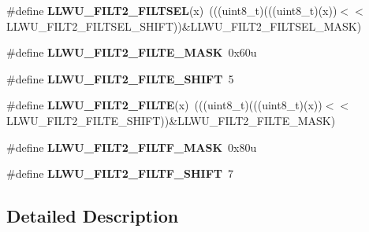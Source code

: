 \begin{DoxyCompactItemize}
\item 
\mbox{\label{group___l_l_w_u___register___masks_ga158cb43770e2439838189522bb7696a3}} 
\#define {\bfseries L\+L\+W\+U\+\_\+\+F\+I\+L\+T2\+\_\+\+F\+I\+L\+T\+S\+EL}(x)~(((uint8\+\_\+t)(((uint8\+\_\+t)(x))$<$$<$L\+L\+W\+U\+\_\+\+F\+I\+L\+T2\+\_\+\+F\+I\+L\+T\+S\+E\+L\+\_\+\+S\+H\+I\+FT))\&L\+L\+W\+U\+\_\+\+F\+I\+L\+T2\+\_\+\+F\+I\+L\+T\+S\+E\+L\+\_\+\+M\+A\+SK)
\item 
\mbox{\label{group___l_l_w_u___register___masks_ga6c6d4145e30bdb324bc6b137b2f7aada}} 
\#define {\bfseries L\+L\+W\+U\+\_\+\+F\+I\+L\+T2\+\_\+\+F\+I\+L\+T\+E\+\_\+\+M\+A\+SK}~0x60u
\item 
\mbox{\label{group___l_l_w_u___register___masks_gac309ec1ef795572d048b09ac35847bf1}} 
\#define {\bfseries L\+L\+W\+U\+\_\+\+F\+I\+L\+T2\+\_\+\+F\+I\+L\+T\+E\+\_\+\+S\+H\+I\+FT}~5
\item 
\mbox{\label{group___l_l_w_u___register___masks_ga3c7ed2286e6f1a0041610a9b7de636ef}} 
\#define {\bfseries L\+L\+W\+U\+\_\+\+F\+I\+L\+T2\+\_\+\+F\+I\+L\+TE}(x)~(((uint8\+\_\+t)(((uint8\+\_\+t)(x))$<$$<$L\+L\+W\+U\+\_\+\+F\+I\+L\+T2\+\_\+\+F\+I\+L\+T\+E\+\_\+\+S\+H\+I\+FT))\&L\+L\+W\+U\+\_\+\+F\+I\+L\+T2\+\_\+\+F\+I\+L\+T\+E\+\_\+\+M\+A\+SK)
\item 
\mbox{\label{group___l_l_w_u___register___masks_gab60be1393d84433fe44d4b332a77537c}} 
\#define {\bfseries L\+L\+W\+U\+\_\+\+F\+I\+L\+T2\+\_\+\+F\+I\+L\+T\+F\+\_\+\+M\+A\+SK}~0x80u
\item 
\mbox{\label{group___l_l_w_u___register___masks_ga20b3ccaef11cade3a0dc88b3a378b790}} 
\#define {\bfseries L\+L\+W\+U\+\_\+\+F\+I\+L\+T2\+\_\+\+F\+I\+L\+T\+F\+\_\+\+S\+H\+I\+FT}~7
\end{DoxyCompactItemize}


\subsection{Detailed Description}
